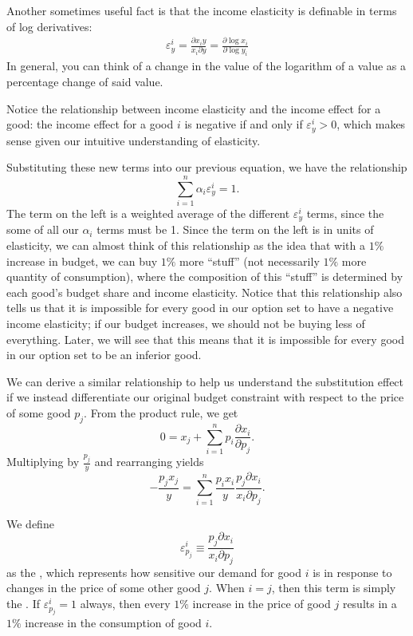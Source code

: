 Another sometimes useful fact is that the income elasticity is definable in terms of log derivatives:
\begin{align*}
    \varepsilon_y^i = \frac{\partial x_i y}{x_i \partial y} = \frac{\partial \log x_i }{\partial \log y_i}
\end{align*}
In general, you can think of a change in the value of the logarithm of a value as a percentage change of said value. 

Notice the relationship between income elasticity and the income effect for a good: the income effect for a good $i$ is negative if and only if $\varepsilon_y^i > 0$, which makes sense given our intuitive understanding of elasticity.

Substituting these new terms into our previous equation, we have the relationship
$$
\sum_{i=1}^{n} \alpha_{i} \varepsilon_{y}^{i} = 1.
$$
The term on the left is a weighted average of the different $\varepsilon_{y}^{i}$ terms, since the some of all our $\alpha_i$ terms must be 1. Since the term on the left is in units of elasticity, we can almost think of this relationship as the idea that with a $1\%$ increase in budget, we can buy $1\%$ more ``stuff'' (not necessarily $1\%$ more quantity of consumption), where the composition of this ``stuff'' is determined by each good's budget share and income elasticity.  Notice that this relationship also tells us that it is impossible for every good in our option set to have a negative income elasticity; if our budget increases, we should not be buying less of everything. Later, we will see that this means that it is impossible for every good in our option set to be an inferior good.

We can derive a similar relationship to help us understand the substitution effect if we instead differentiate our original budget constraint with respect to the price of some good $p_j$. From the product rule, we get
$$
0=x_{j}+\sum_{i=1}^{n} p_{i} \frac{\partial x_{i}}{\partial p_{j}}.
$$
Multiplying by $\frac{p_j}{y}$ and rearranging yields 
$$
-\frac{p_{j} x_{j}}{y}=\sum_{i=1}^{n} \frac{p_{i} x_{i}}{y} \frac{p_{j} \partial x_{i}}{x_{i} \partial p_{j}}.
$$

We define 
$$\varepsilon_{p_j}^i \equiv \frac{p_j \partial x_{i}}{x_{i} \partial p_j}$$
as the , which represents how sensitive our demand for good $i$ is in response to changes in the price of some other good $j$. When $i=j$, then this term is simply the . If $\varepsilon_{p_j}^i = 1$ always, then every $1\%$ increase in the price of good $j$ results in a $1\%$ increase in the consumption of good $i$.

